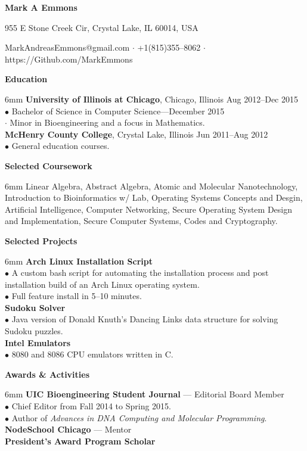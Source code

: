 \documentclass[11pt]{article}
\newcommand{\sectionheader}[1]{\noindent \textbf{\large #1}}
\newenvironment{sectionbody}{\begin{adjustwidth}{6mm}{}}{\end{adjustwidth}}
\begin{document}

\centerline{\LARGE \bf Mark A Emmons}
\centerline{955 E Stone Creek Cir, Crystal Lake, IL 60014, USA}
\centerline{MarkAndreasEmmons@gmail.com $\cdot$ +1(815)355--8062 $\cdot$ https://Github.com/MarkEmmons}

\sectionheader{Education}
\begin{sectionbody}
{\bf University of Illinois at Chicago}, Chicago, Illinois \hfill Aug 2012--Dec 2015 \\
$\bullet$ Bachelor of Science in Computer Science---December 2015 \\
\indent $\cdot$ Minor in Bioengineering and a focus in Mathematics. \\
{\bf McHenry County College}, Crystal Lake, Illinois \hfill Jun 2011--Aug 2012 \\
$\bullet$ General education courses.
\end{sectionbody}

\sectionheader{Selected Coursework}
\begin{sectionbody}
Linear Algebra, Abstract Algebra, Atomic and Molecular Nanotechnology, Introduction to Bioinformatics w/ Lab, Operating Systems Concepts and Desgin, Artificial Intelligence, Computer Networking, Secure Operating System Design and Implementation, Secure Computer Systems, Codes and Cryptography.
\end{sectionbody}

\sectionheader{Selected Projects}
\begin{sectionbody}
{\bf Arch Linux Installation Script} \\
$\bullet$ A custom bash script for automating the installation process and post installation build of an Arch Linux operating system. \\
$\bullet$ Full feature install in 5--10 minutes. \\
{\bf Sudoku Solver} \\
$\bullet$ Java version of Donald Knuth's Dancing Links data structure for solving Sudoku puzzles. \\
{\bf Intel Emulators} \\
$\bullet$ 8080 and 8086 CPU emulators written in C.
\end{sectionbody}

\sectionheader{Awards \& Activities}
\begin{sectionbody}
{\bf UIC Bioengineering Student Journal} --- Editorial Board Member \\
$\bullet$ Chief Editor from Fall 2014 to Spring 2015. \\
$\bullet$ Author of {\it Advances in DNA Computing and Molecular Programming}. \\
{\bf NodeSchool Chicago} --- Mentor \\
{\bf President's Award Program Scholar}
\end{sectionbody}
\end{document}
